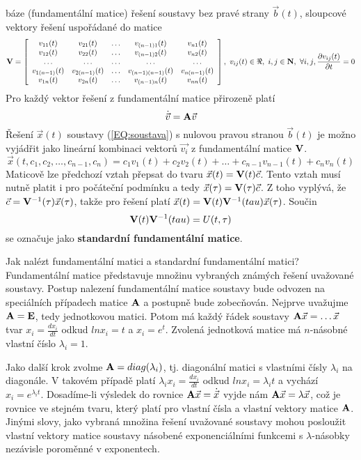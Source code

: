báze (fundamentální matice) řešení soustavy bez pravé strany $\vec{b}(t)$, sloupcové vektory řešení uspořádané do matice
\[
 {\bf V} = 
  \left[
    \begin{array}{ccccc}
     v_{11}(t) & v_{21}(t) & \ldots & v_{(n-1)1}(t) & v_{n1}(t) \\
     v_{12}(t) & v_{22}(t) & \ldots & v_{(n-1)2}(t) & v_{n2}(t) \\
     \ldots & \ldots & \ldots & \ldots & \ldots \\
     v_{1(n-1)}(t) & v_{2(n-1)}(t) & \ldots & v_{(n-1)(n-1)}(t) & v_{n(n-1)}(t) \\
     v_{1n}(t) & v_{2n}(t) & \ldots & v_{(n-1)n}(t) & v_{nn}(t) \\
    \end{array}
  \right],~v_{ij}(t)\in\Re,~i,j\in{\bf N},~\forall{i,j},\frac{\partial v_{ij}(t)}{\partial t} = 0
\]
Pro každý vektor řešení z fundamentální matice přirozeně platí
\[
 \dot{\vec{v}} = {\bf A} \vec{v}
\]
Řešení $\vec{x}(t)$ soustavy (\ref{EQ:soustava}) s nulovou pravou stranou $\vec{b}(t)$ je možno vyjádřit jako lineární kombinaci  vektorů $\vec{v_i}$ z fundamentální matice ${\bf V}$.
\[
 \vec{x}(t,c_1,c_2,\ldots,c_{n-1},c_n) = c_1 v_1(t) + c_2 v_2(t) + \ldots + c_{n-1}v_{n-1}(t) + c_{n} v_{n}(t)
\]
Maticově lze předchozí vztah přepsat do tvaru
$ \vec{x}(t)= {\bf V}(t)\vec{c}$.
Tento vztah musí nutně platit i pro počáteční podmínku a tedy
$ \vec{x}(\tau) = {\bf V}(\tau)\vec{c}$. Z toho vyplývá, že $\vec{c} = {\bf V}^{-1}(\tau)\vec{x}(\tau)$, takže pro řešení platí $\vec{x}(t)= {\bf V}(t){\bf V}^{-1}(tau)\vec{x}(\tau)$. Součin
\[
 {\bf V}(t){\bf V}^{-1}(tau) = U(t,\tau)
\]
se označuje jako {\bf standardní fundamentální matice}.

Jak nalézt fundamentální matici a standardní fundamentální matici?\newline
Fundamentální matice představuje množinu vybraných známých řešení uvažované soustavy. Postup nalezení fundamentální matice soustavy bude odvozen na speciálních případech matice ${\bf A}$ a postupně bude zobecňován. Nejprve uvažujme ${\bf A} = {\bf E}$, tedy jednotkovou matici. Potom má každý řádek soustavy ${\bf A}\vec{x} = \dots{\vec{x}}$ tvar $x_i = \frac{dx_i}{dt}$ odkud $ln{x_i} = t$ a $x_i = e^{t}$. Zvolená jednotková matice má $n$-násobné vlastní číslo $\lambda_i = 1$.

Jako další krok zvolme ${\bf A} = diag(\lambda_i)$, tj. diagonální matici s vlastními čísly $\lambda_i$ na diagonále. V takovém případě platí $\lambda_i x_i = \frac{dx_i}{dt}$ odkud $ln{x_i} = \lambda_i t$ a vychází $x_i = e^{\lambda_i t}$.\newline
Dosadíme-li výsledek do rovnice ${\bf A}\vec{x} = \dot{\vec{x}}$ vyjde nám ${\bf A}\vec{x} = \lambda\vec{x}$, což je rovnice ve stejném tvaru, který platí pro vlastní čísla a vlastní vektory matice ${\bf A}$. Jinými slovy, jako vybraná množina řešení uvažované soustavy mohou posloužit vlastní vektory matice soustavy násobené exponenciálními funkcemi s $\lambda$-násobky nezávisle poroměnné v exponentech.

